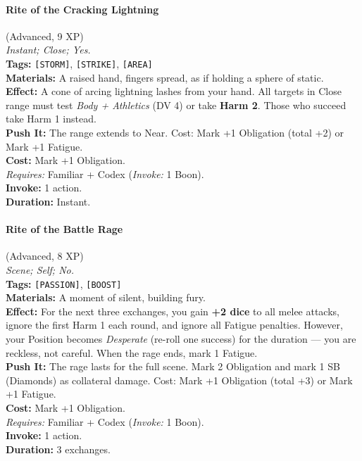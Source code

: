 \paragraph{Rite of the Cracking Lightning} (Advanced, 9 XP) \hfill \\
\emph{Instant; Close; Yes.} \\
\textbf{Tags:} \texttt{[STORM]}, \texttt{[STRIKE]}, \texttt{[AREA]} \\
\textbf{Materials:} A raised hand, fingers spread, as if holding a sphere of static. \\
\textbf{Effect:} A cone of arcing lightning lashes from your hand. All targets in Close range must test \textit{Body + Athletics} (DV 4) or take \textbf{Harm 2}. Those who succeed take Harm 1 instead. \\
\textbf{Push It:} The range extends to Near. Cost: Mark +1 Obligation (total +2) or Mark +1 Fatigue. \\
\textbf{Cost:} Mark +1 Obligation. \\
\textit{Requires:} Familiar + Codex (\textit{Invoke:} 1 Boon). \\
\textbf{Invoke:} 1 action. \\
\textbf{Duration:} Instant.

\paragraph{Rite of the Battle Rage} (Advanced, 8 XP) \hfill \\
\emph{Scene; Self; No.} \\
\textbf{Tags:} \texttt{[PASSION]}, \texttt{[BOOST]} \\
\textbf{Materials:} A moment of silent, building fury. \\
\textbf{Effect:} For the next three exchanges, you gain \textbf{+2 dice} to all melee attacks, ignore the first Harm 1 each round, and ignore all Fatigue penalties. However, your Position becomes \textit{Desperate} (re-roll one success) for the duration --- you are reckless, not careful. When the rage ends, mark 1 Fatigue. \\
\textbf{Push It:} The rage lasts for the full scene. Mark 2 Obligation and mark 1 SB (Diamonds) as collateral damage. Cost: Mark +1 Obligation (total +3) or Mark +1 Fatigue. \\
\textbf{Cost:} Mark +1 Obligation. \\
\textit{Requires:} Familiar + Codex (\textit{Invoke:} 1 Boon). \\
\textbf{Invoke:} 1 action. \\
\textbf{Duration:} 3 exchanges.

